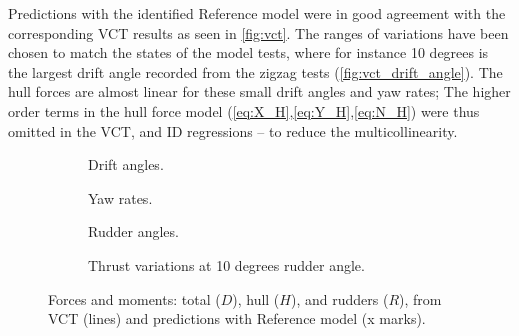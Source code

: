 Predictions with the identified Reference model were in good agreement with the corresponding VCT results as seen in \autoref{fig:vct}. The ranges of variations have been chosen to match the states of the model tests, where for instance 10 degrees is the largest drift angle recorded from the zigzag tests (\autoref{fig:vct_drift_angle}). The hull forces are almost linear for these small drift angles and yaw rates; The higher order terms in the hull force model (\autoref{eq:X_H},\autoref{eq:Y_H},\autoref{eq:N_H}) were thus omitted in the VCT, and ID regressions -- to reduce the multicollinearity.
\begin{figure}
     \centering
     \begin{subfigure}[b]{0.49\textwidth}
         \centering
         
         \caption{Drift angles.}
         \label{fig:vct_drift_angle}
     \end{subfigure}
     \hfill
     \begin{subfigure}[b]{0.49\textwidth}
         \centering
         
         \caption{Yaw rates.}
         \label{fig:vct_circle}
     \end{subfigure}
     \begin{subfigure}[b]{0.49\textwidth}
         \centering
         
         \caption{Rudder angles.}
         \label{fig:vct_rudder_angle}
     \end{subfigure}
     \hfill
     \begin{subfigure}[b]{0.49\textwidth}
         \centering
         
         \caption{Thrust variations at 10 degrees rudder angle.}
         \label{fig:vct_thrust_variation}
     \end{subfigure}
     \caption{Forces and moments: total ($D$), hull ($H$), and rudders ($R$), from VCT (lines) and predictions with Reference model (x marks).}
     \label{fig:vct}
\end{figure}